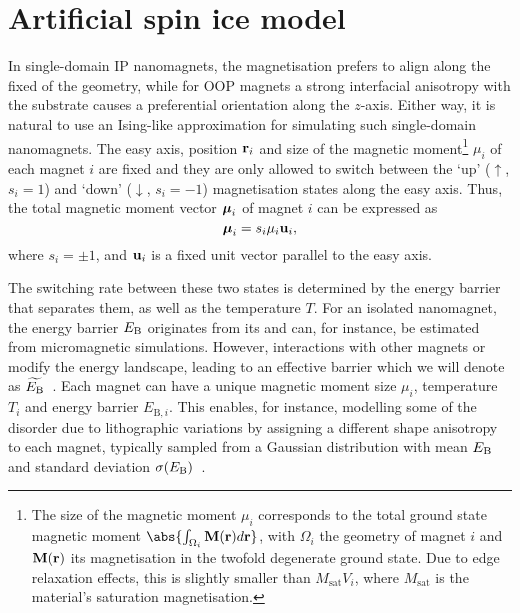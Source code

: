 \newpage
\section{Artificial spin ice model}
In single-domain IP nanomagnets, the magnetisation prefers to align along the fixed  of the geometry, while for OOP magnets a strong interfacial anisotropy with the substrate causes a preferential orientation along the $z$-axis.
Either way, it is natural to use an Ising-like approximation for simulating such single-domain nanomagnets.
The easy axis, position $\boldsymbol{\mathbf{r}}_i$ and size of the magnetic moment\footnote{
	\label{fn:2:moment_integral}
	The size of the magnetic moment $\mu_i$ corresponds to the total ground state magnetic moment $\abs{\int_{\Omega_i} \vc{M}(\vc{r})d\vc{r}}$, with $\Omega_i$ the geometry of magnet $i$ and $\boldsymbol{\mathbf{M}}(\boldsymbol{\mathbf{r}})$ its magnetisation in the twofold degenerate ground state.
	Due to edge relaxation effects, this is slightly smaller than $M_\mathrm{sat} V_i$, where $M_\mathrm{sat}$ is the material's saturation magnetisation.
} $\mu_i$ of each magnet $i$ are fixed and they are only allowed to switch between the `up' ($\uparrow$, $s_i=1$) and `down' ($\downarrow$, $s_i=-1$) magnetisation states along the easy axis.
Thus, the total magnetic moment vector $\boldsymbol{\mathbf{\mu}}_i$ of magnet $i$ can be expressed as
\begin{equation}
	\boldsymbol{\mathbf{\mu}}_i = s_i \mu_i \boldsymbol{\mathbf{u}}_i \mathrm{,}
\end{equation}
where $s_i = \pm 1$, and $\boldsymbol{\mathbf{u}}_i$ is a fixed unit vector parallel to the easy axis. \par
The switching rate between these two states is determined by the energy barrier that separates them, as well as the temperature $T$. %
For an isolated nanomagnet, the energy barrier $E_\mathrm{B}$ originates from its  and can, for instance, be estimated from micromagnetic simulations.
However, interactions with other magnets or  modify the energy landscape, leading to an effective barrier which we will denote as $\widetilde{E_\mathrm{B}}$~\cite{leo2021chiral}.
Each magnet can have a unique magnetic moment size $\mu_i$, temperature $T_i$ and energy barrier $E_{\mathrm{B},i}$.
This enables, for instance, modelling some of the disorder due to lithographic variations by assigning a different shape anisotropy to each magnet, typically sampled from a Gaussian distribution with mean $E_\mathrm{B}$ and standard deviation $\sigma(E_\mathrm{B})$~\cite{DisorderGroundStateASI}. \\\par

